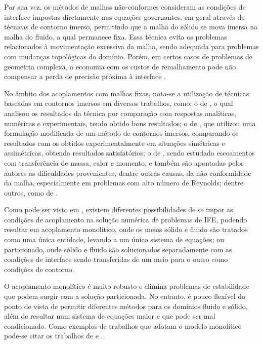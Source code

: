 Por sua vez, os métodos de malhas não-conformes consideram as condições de interface impostas diretamente nas equações governantes, em geral através de técnicas de contorno imerso, permitindo que a malha do sólido se mova imersa na malha do fluido, a qual permanece fixa. Essa técnica evita os problemas relacionados à movimentação excessiva da malha, sendo adequada para problemas com mudanças topológicas do domínio. Porém, em certos casos de problemas de geometria complexa, a economia com os custos de remalhamento pode não compensar a perda de precisão próxima à interface \cite{bazilevs2013computational,hou2012numerical,bazilevs2015ale}.

No âmbito dos acoplamentos com malhas fixas, nota-se a utilização de técnicas baseadas em contornos imersos em diversos trabalhos, como: o de , o qual analisou os resultados da técnica por comparação com respostas analíticas, numéricas e experimentais, tendo obtido bons resultados; o de , que utilizou uma formulação modificada de um método de contornos imersos, comparando os resultados com os obtidos experimentalmente em situações simétricas e assimétricas, obtendo resultados satisfatórios; o de , sendo estudado escoamentos com transferência de massa, calor e momento, e também são apontadas pelos autores as dificuldades provenientes, dentre outras causas, da não conformidade da malha, especialmente em problemas com alto número de Reynolds; dentre outros, como de .

Como pode ser visto em , existem diferentes possibilidades de se impor as condições de acoplamento na solução numérica de problemas de IFE, podendo resultar em acoplamento monolítico, onde os meios sólido e fluido são tratados como uma única entidade, levando a um único sistema de equações; ou particionado, onde sólido e fluido são solucionados separadamente com as condições de interface sendo transferidas de um meio para o outro como condições de contorno.

O acoplamento monolítico é muito robusto e elimina problemas de estabilidade que podem surgir com a solução particionada. No entanto, é pouco flexível do ponto de vista de permitir diferentes métodos para os domínios fluido e sólido, além de resultar num sistema de equações maior e que pode ser mal condicionado. Como exemplos de trabalhos que adotam o modelo monolítico pode-se citar os trabalhos de  e .

